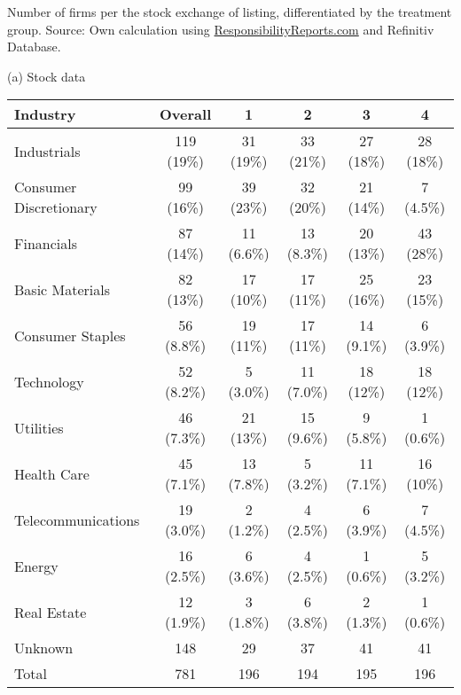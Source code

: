 \documentclass[12pt]{article}
\begin{document}
\begin{table}
    \vspace{0.2cm}

    \begin{tablenotes}
        \footnotesize
        \item Number of firms per the stock exchange of listing, differentiated by the treatment group. Source: Own calculation using \href{https://responsibilityreports.com}{ResponsibilityReports.com} and Refinitiv Database.
    \end{tablenotes}

\end{table}


\newpage




\begin{table}
    \centering
    \label{tab:industries}

    (a) Stock data
    \vspace{0.5cm}

    \begin{tabular}{lccccc}
    \toprule
    Industry & Overall & 1 & 2 & 3 & 4 \\
    \midrule
    Industrials & 119 (19\%) & 31 (19\%) & 33 (21\%) & 27 (18\%) & 28 (18\%)\\
    Consumer Discretionary & 99 (16\%) & 39 (23\%) & 32 (20\%) & 21 (14\%) & 7 (4.5\%)\\
    Financials & 87 (14\%) & 11 (6.6\%) & 13 (8.3\%) & 20 (13\%) & 43 (28\%)\\
    Basic Materials & 82 (13\%) & 17 (10\%) & 17 (11\%) & 25 (16\%) & 23 (15\%)\\
    Consumer Staples & 56 (8.8\%) & 19 (11\%) & 17 (11\%) & 14 (9.1\%) & 6 (3.9\%)\\
    Technology & 52 (8.2\%) & 5 (3.0\%) & 11 (7.0\%) & 18 (12\%) & 18 (12\%)\\
    Utilities & 46 (7.3\%) & 21 (13\%) & 15 (9.6\%) & 9 (5.8\%) & 1 (0.6\%)\\
    Health Care & 45 (7.1\%) & 13 (7.8\%) & 5 (3.2\%) & 11 (7.1\%) & 16 (10\%)\\
    Telecommunications & 19 (3.0\%) & 2 (1.2\%) & 4 (2.5\%) & 6 (3.9\%) & 7 (4.5\%)\\
    Energy & 16 (2.5\%) & 6 (3.6\%) & 4 (2.5\%) & 1 (0.6\%) & 5 (3.2\%)\\
    Real Estate & 12 (1.9\%) & 3 (1.8\%) & 6 (3.8\%) & 2 (1.3\%) & 1 (0.6\%)\\
    Unknown & 148 & 29 & 37 & 41 & 41\\
    \midrule 
    Total & 781 & 196 & 194 & 195 & 196\\
    \bottomrule
    \end{tabular}


\end{table}
\end{document}
